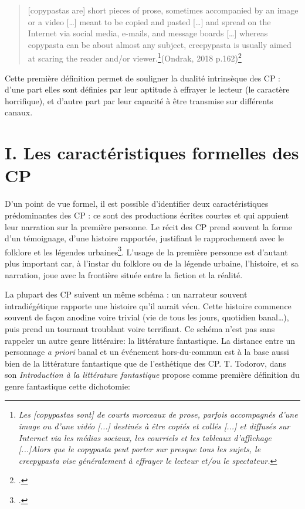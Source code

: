 \documentclass[12pt,a4paper,oneside,titlepage]{article} %
\begin{document}
\begin{quotation}
	[copypastas are] short pieces of prose, sometimes accompanied by an image or a video […] meant to be copied
			and pasted […] and spread on the Internet via social media, e-mails, and message boards […]
			whereas copypasta can be about almost any subject, creepypasta is usually aimed at scaring
			the reader and/or viewer.\footnote{\emph{Les [copypastas sont] de courts morceaux de prose, parfois accompagnés d'une image ou d'une vidéo [...] destinés à être copiés et collés [...] et diffusés sur Internet via les médias sociaux, les courriels et les tableaux d'affichage [...]Alors que le copypasta peut porter sur presque tous les sujets, le creepypasta vise généralement à effrayer le lecteur et/ou le spectateur.}}(Ondrak, 2018 p.162)\footcite{ondrak_spectres_2018}
\end{quotation}
	\par
	Cette première définition permet de souligner la dualité intrinsèque des CP : d'une part elles sont définies par leur aptitude à effrayer le lecteur (le caractère horrifique), et d'autre part par leur capacité à être transmise sur différents canaux. 
	
\section*{I.	Les caractéristiques formelles des CP}
	
\par
D’un point de vue formel, il est possible d’identifier deux caractéristiques prédominantes des CP : ce sont des productions écrites courtes et qui appuient leur narration sur la première personne. Le récit des CP prend souvent la forme d’un témoignage, d’une histoire rapportée, justifiant le rapprochement avec le folklore et les légendes urbaines\footcite{blank_slender_2018}. L’usage de la première personne est d’autant plus important car, à l’instar du folklore ou de la légende urbaine, l’histoire, et sa narration, joue avec la frontière située entre la fiction et la réalité. 
\par
La plupart des CP suivent un même schéma : un narrateur souvent intradiégétique rapporte une histoire qu’il aurait vécu. Cette histoire commence souvent de façon anodine voire trivial (vie de tous les jours, quotidien banal…), puis prend un tournant troublant voire terrifiant. 
Ce schéma n’est pas sans rappeler un autre genre littéraire: la littérature fantastique. La distance entre un personnage \emph{a priori} banal et un événement hors-du-commun est à la base aussi bien de la littérature fantastique que de l’esthétique des CP. \newline
T. Todorov, dans son \emph{Introduction à la littérature fantastique} propose comme première définition du genre  fantastique cette dichotomie: 
\end{document}
